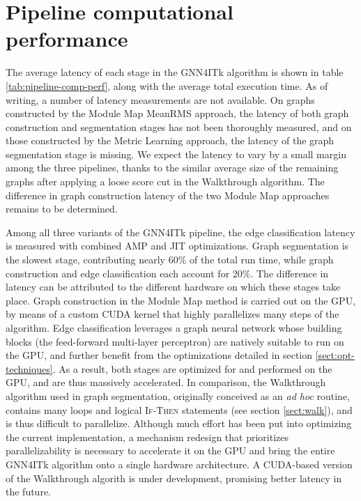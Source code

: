

\section{Pipeline computational performance}
\label{sect:pipeline-comp-perf}
The average latency of each stage in the GNN4ITk algorithm is shown in table \ref{tab:pipeline-comp-perf}, along with the average total execution time. 
As of writing, a number of latency measurements are not available.
On graphs constructed by the Module Map MeanRMS approach, the latency of both graph construction and segmentation stages has not been thoroughly measured, and on those 
constructed by the Metric Learning approach, the latency of the graph segmentation stage is missing.
We expect the latency to vary by a small margin among the three pipelines, thanks to the similar average size of the remaining graphs after applying a loose score cut in the Walkthrough algorithm.
The difference in graph construction latency of the two Module Map approaches remains to be determined.

Among all three variants of the GNN4ITk pipeline, the edge classification latency is measured with combined AMP and JIT optimizations.
Graph segmentation is the slowest stage, contributing nearly 60\% of the total run time, while graph construction and edge classification each account for 20\%.
The difference in latency can be attributed to the different hardware on which these stages take place.
Graph construction in the Module Map method is carried out on the GPU, by means of a custom CUDA kernel that highly parallelizes many steps of the algorithm.
Edge classification leverages a graph neural network whose building blocks (the feed-forward multi-layer perceptron) are natively suitable to run on the GPU, and further benefit from the optimizations detailed in section \ref{sect:opt-techniques}.
As a result, both stages are optimized for and performed on the GPU, and are thus massively accelerated.
In comparison, the Walkthrough algorithm used in graph segmentation, originally conceived as an \textit{ad hoc} routine, contains many loops and logical \textsc{If-Then} statements (see section \ref{sect:walk}), and is thus difficult to parallelize.  
Although much effort has been put into optimizing the current implementation, a mechanism redesign that prioritizes parallelizability is necessary to accelerate it on the GPU and bring the entire GNN4ITk algorithm onto a single hardware architecture.
A CUDA-based version of the Walkthrough algorith is under development, promising better latency in the future. 

